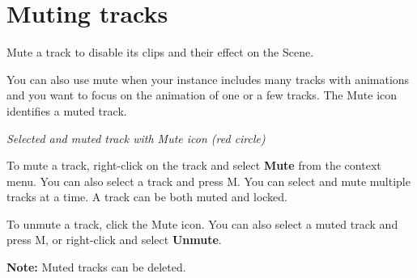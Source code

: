\chapter{Muting tracks}
\hypertarget{md__library_2_package_cache_2com_8unity_8timeline_0d1_87_86_2_documentation_0i_2trk__mute}{}\label{md__library_2_package_cache_2com_8unity_8timeline_0d1_87_86_2_documentation_0i_2trk__mute}
\label{md__library_2_package_cache_2com_8unity_8timeline_0d1_87_86_2_documentation_0i_2trk__mute_autotoc_md1261}%
%
 Mute a track to disable its clips and their effect on the Scene.

You can also use mute when your  instance includes many tracks with animations and you want to focus on the animation of one or a few tracks. The Mute icon identifies a muted track.



{\itshape Selected and muted track with Mute icon (red circle)}

To mute a track, right-\/click on the track and select {\bfseries{Mute}} from the context menu. You can also select a track and press M. You can select and mute multiple tracks at a time. A track can be both muted and locked.

To unmute a track, click the Mute icon. You can also select a muted track and press M, or right-\/click and select {\bfseries{Unmute}}.

{\bfseries{Note\+:}} Muted tracks can be deleted. 